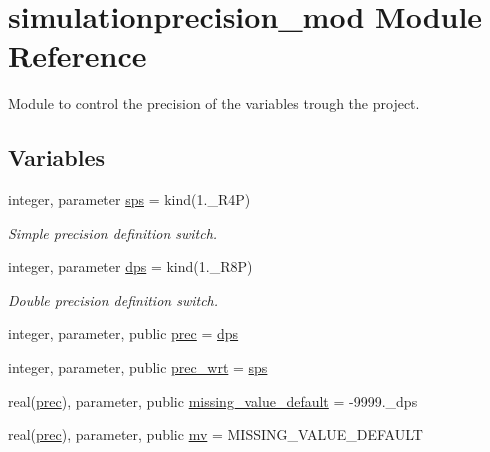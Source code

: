 \hypertarget{namespacesimulationprecision__mod}{}\section{simulationprecision\+\_\+mod Module Reference}
\label{namespacesimulationprecision__mod}


Module to control the precision of the variables trough the project.  


\subsection*{Variables}
\begin{DoxyCompactItemize}
\item 
integer, parameter \mbox{\hyperlink{namespacesimulationprecision__mod_a4e5f74805628e67a1d7b33106780b85d}{sps}} = kind(1.\+\_\+\+R4P)
\begin{DoxyCompactList}\small\item\em Simple precision definition switch. \end{DoxyCompactList}\item 
integer, parameter \mbox{\hyperlink{namespacesimulationprecision__mod_a1993497bc3b1b9925d3e409fe8891e8c}{dps}} = kind(1.\+\_\+\+R8P)
\begin{DoxyCompactList}\small\item\em Double precision definition switch. \end{DoxyCompactList}\item 
integer, parameter, public \mbox{\hyperlink{namespacesimulationprecision__mod_a361ca48174e0dc2228c07f25fa5396ec}{prec}} = \mbox{\hyperlink{namespacesimulationprecision__mod_a1993497bc3b1b9925d3e409fe8891e8c}{dps}}
\item 
integer, parameter, public \mbox{\hyperlink{namespacesimulationprecision__mod_a2afc058035b6678d4ba773117f7c5202}{prec\+\_\+wrt}} = \mbox{\hyperlink{namespacesimulationprecision__mod_a4e5f74805628e67a1d7b33106780b85d}{sps}}
\item 
real(\mbox{\hyperlink{namespacesimulationprecision__mod_a361ca48174e0dc2228c07f25fa5396ec}{prec}}), parameter, public \mbox{\hyperlink{namespacesimulationprecision__mod_a8fe62365170cdfed5a745be6d8e99e1c}{missing\+\_\+value\+\_\+default}} = -\/9999.\+\_\+dps
\item 
real(\mbox{\hyperlink{namespacesimulationprecision__mod_a361ca48174e0dc2228c07f25fa5396ec}{prec}}), parameter, public \mbox{\hyperlink{namespacesimulationprecision__mod_aee970e36f3dc8fb77c175ead993257d9}{mv}} = M\+I\+S\+S\+I\+N\+G\+\_\+\+V\+A\+L\+U\+E\+\_\+\+D\+E\+F\+A\+U\+LT

\end{DoxyCompactItemize}
